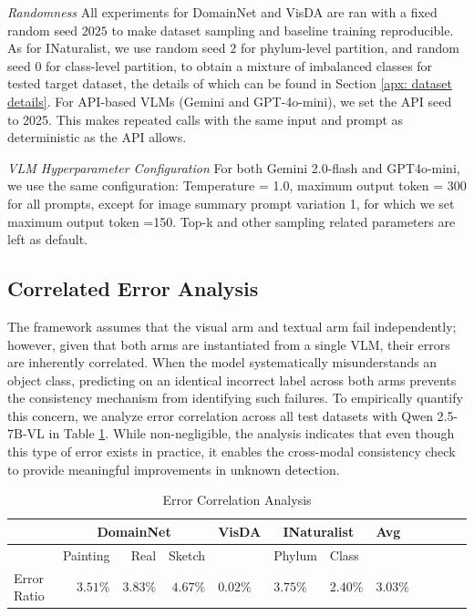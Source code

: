 \documentclass[10pt]{article} %
\begin{document}
{\em Randomness} All experiments for DomainNet and VisDA are ran with a fixed random seed $2025$ to make dataset sampling and baseline training reproducible. As for INaturalist, we use random seed $2$ for phylum-level partition, and random seed $0$ for class-level partition, to obtain a mixture of imbalanced classes for tested target dataset, the details of which can be found in Section \ref{apx: dataset details}. For API-based VLMs (Gemini and GPT-4o-mini), we set the API seed to 2025. This makes repeated calls with the same input and prompt as deterministic as the API allows.

{\em VLM Hyperparameter Configuration} For both Gemini 2.0-flash and GPT4o-mini, we use the same configuration: Temperature = 1.0, maximum output token = 300 for all prompts, except for image summary prompt variation 1, for which we set maximum output token =150. Top-k and other sampling related parameters are left as default.

\subsection{Correlated Error Analysis} \label{apx: correlated error}
The framework assumes that the visual arm and textual arm fail independently; however, given that both arms are instantiated from a single VLM, their errors are inherently correlated. When the model systematically misunderstands an object class, predicting on an identical incorrect label across both arms prevents the consistency mechanism from identifying such failures. To empirically quantify this concern, we analyze error correlation across all test datasets with Qwen 2.5-7B-VL in Table \ref{tab: correlated}. While non-negligible, the analysis indicates that even though this type of error exists in practice, it enables the cross-modal consistency check to provide meaningful improvements in unknown detection.

\begin{table}[ht]
\caption{Error Correlation Analysis}
\label{tab: correlated}
\begin{center}
\begin{tabular}{lrrrllllllll}
 &\multicolumn{3}{c}{\bf DomainNet} &\multicolumn{1}{c}{\bf VisDA} &\multicolumn{2}{c}{\bf INaturalist} & \textbf{Avg}
\\ \hline
  & Painting & Real & Sketch & & Phylum & Class \\
\hline 
Error Ratio & $3.51\%$ & $3.83\%$ & $4.67\%$ & $0.02\%$ & $3.75\%$ & $2.40\%$ & $3.03\%$\\
\end{tabular}
\end{center}
\end{table}
\end{document}
